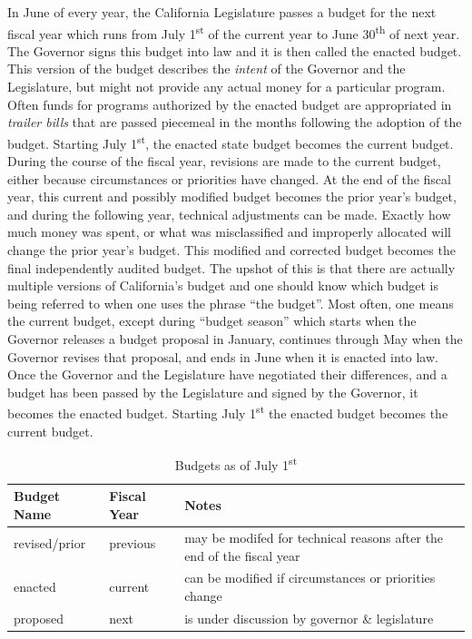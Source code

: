 In June of every year, the California Legislature passes a budget for the next fiscal year which runs from July 1\textsuperscript{st} of the current year to June 30\textsuperscript{th} of next year. The Governor signs this budget into law and it is then called the enacted budget. This version of the budget describes the \textit{intent} of the Governor and the Legislature, but might not provide any actual money for a particular program. Often funds for programs authorized by the enacted budget are appropriated in \textit{trailer bills} that are passed piecemeal in the months following the adoption of the budget. Starting July 1\textsuperscript{st}, the enacted state budget becomes the current budget. During the course of the fiscal year, revisions are made to the current budget, either because circumstances or priorities have changed. At the end of the fiscal year, this current and possibly modified budget becomes the prior year's budget, and during the following year, technical adjustments can be made. Exactly how much money was spent, or what was misclassified and improperly allocated will change the prior year's budget. This modified and corrected budget becomes the final independently audited budget. The upshot of this is that there are actually multiple versions of California's budget and one should know which budget is being referred to when one uses the phrase ``the budget''. Most often, one means the current budget, except during ``budget season'' which starts when the Governor releases a budget proposal in January, continues through May when the Governor revises that proposal, and ends in June when it is enacted into law. Once the Governor and the Legislature have negotiated their differences, and a budget has been passed by the Legislature and signed by the Governor, it becomes the enacted budget. Starting July 1\textsuperscript{st} the enacted budget becomes the current budget.

\begin{table}[htp]
  \label{tab:july_1_budgets}%
  \OnehalfSpacing%
  \caption{Budgets as of July 1\textsuperscript{st}}%
  \begin{tabularx}{\linewidth}{lll}
    \toprule
    \textbf{Budget Name} & \textbf{Fiscal Year} & \textbf{Notes}\\
    \midrule
      revised/prior  & previous & \multirow[t]{2}{4in}{may be modifed for technical reasons after the end of the fiscal year}\\\vspace{1ex}\\
      enacted  & current  & can be modified if circumstances or priorities change\vspace{1ex}\\
      proposed & next     & is under discussion by governor \& legislature\\
  \bottomrule
\end{tabularx}
\end{table}

